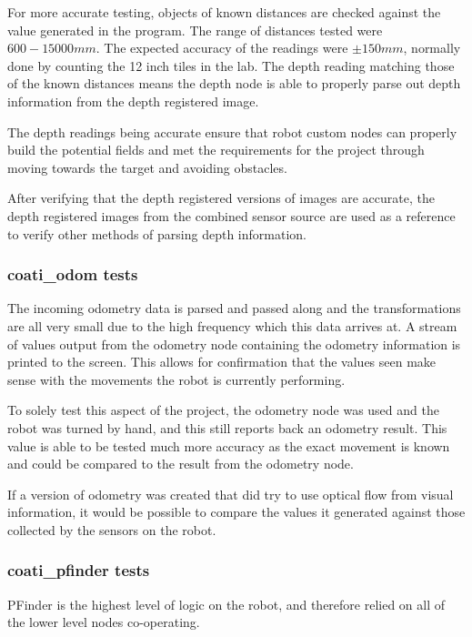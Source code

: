 \documentclass{article}[12]
\begin{document}
	For more accurate testing, objects of known distances are checked against the value generated in the program. The range of distances tested were $600-15000mm$. The expected accuracy of the readings were $\pm 150mm$, normally done by counting the 12 inch tiles in the lab. The depth reading matching those of the known distances means the depth node is able to properly parse out depth information from the depth registered image.

	The depth readings being accurate ensure that robot custom nodes can properly build the potential fields and met the requirements for the project through moving towards the target and avoiding obstacles. 

	After verifying that the depth registered versions of images are accurate, the depth registered images from the combined sensor source are used as a reference to verify other methods of parsing depth information.
	
	\subsubsection{coati\_odom tests}
	
	The incoming odometry data is parsed and passed along and the transformations are all very small due to the high frequency which this data arrives at. A stream of values output from the odometry node containing the odometry information is printed to the screen. This allows for confirmation that the values seen make sense with the movements the robot is currently performing. 
	
	To solely test this aspect of the project, the odometry node was used and the robot was turned by hand, and this still reports back an odometry result. This value is able to be tested much more accuracy as the exact movement is known and could be compared to the result from the odometry node. 

	If a version of odometry was created that did try to use optical flow from visual information, it would be possible to compare the values it generated against those collected by the sensors on the robot.
	
	\subsubsection{coati\_pfinder tests}
	
	PFinder is the highest level of logic on the robot, and therefore relied on all of the lower level nodes co-operating. 
	
\end{document}
